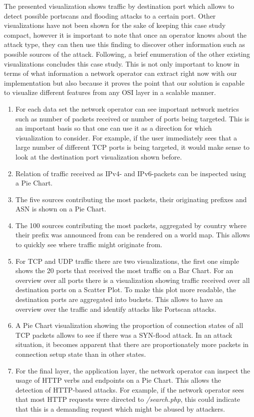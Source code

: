 The presented visualization shows traffic by destination port which allows to detect possible portscans and flooding attacks to a certain port. Other visualizations have not been shown for the sake of keeping this case study compact, however it is important to note that once an operator knows about the attack type, they can then use this finding to discover other information such as possible sources of the attack.
Following, a brief enumeration of the other existing visualizations concludes this case study. This is not only important to know in terms of what information a network operator can extract right now with our implementation but also because it proves the point that our solution is capable to visualize different features from any OSI layer in a scalable manner.

 \begin{enumerate}
     \item For each data set the network operator can see important network metrics such as number of packets received or number of ports being targeted. This is an important basis so that one can use it as a direction for which visualization to consider. For example, if the user immediately sees that a large number of different TCP ports is being targeted, it would make sense to look at the destination port visualization shown before.
     \item Relation of traffic received as IPv4- and IPv6-packets can be inspected using a Pie Chart.
     \item The five sources contributing the most packets, their originating prefixes and ASN is shown on a Pie Chart.
     \item The 100 sources contributing the most packets, aggregated by country where their prefix was announced from can be rendered on a world map. This allows to quickly see where traffic might originate from.
     \item For TCP and UDP traffic there are two visualizations, the first one simple shows the 20 ports that received the most traffic on a Bar Chart. For an overview over all ports there is a visualization showing traffic received over all destination ports on a Scatter Plot. To make this plot more readable, the destination ports are aggregated into buckets. This allows to have an overview over the traffic and identify attacks like Portscan attacks.
     \item A Pie Chart visualization showing the proportion of connection states of all TCP packets allows to see if there was a SYN-flood attack. In an attack situation, it becomes apparent that there are proportionately more packets in connection setup state than in other states.
     \item For the final layer, the application layer, the network operator can inspect the usage of HTTP verbs and endpoints on a Pie Chart. This allows the detection of HTTP-based attacks. For example, if the network operator sees that most HTTP requests were directed to \textit{/search.php}, this could indicate that this is a demanding request which might be abused by attackers.
 \end{enumerate}{}



